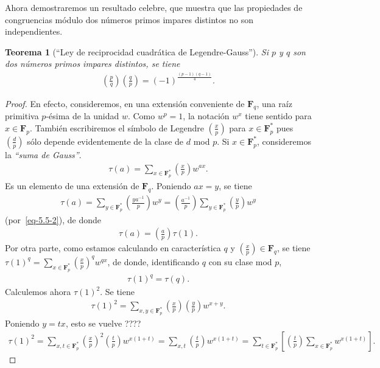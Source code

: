 \documentclass[10pt,oneside,bibtotoc,smallheadings,leqno,a5paper,DIV=12]{scrbook}
\newcommand{\FF}{\mathbf{F}}
\newcommand{\leg}[2]{\left(\frac{#1}{#2}\right)}
\numberwithin{equation}{section}
\theoremstyle{defi}
\theoremstyle{enonce}
\newtheorem{theorem}{Teorema}
\theoremstyle{rem}
\numberwithin{theorem}{section}
\numberwithin{proposition}{section}
\numberwithin{definition}{section}
\numberwithin{lemma}{section}
\numberwithin{corollary}{section}
\numberwithin{example}{section}
\numberwithin{footnote}{section}%
\begin{document}
Ahora demostraremos un resultado celebre, que muestra que las propiedades de congruencias m\'odulo dos
n\'umeros primos impares distintos no son independientes.

\begin{theorem}[``Ley de reciprocidad cuadr\'atica de Legendre-Gauss'']\label{teo5.5.1}
Si $p$ y $q$ son dos n\'umeros primos impares distintos, se tiene
\begin{gather*}
\leg{p}{q}\leg{q}{p}=(-1)^{\frac{(p-1)(q-1)}{4}}.
\end{gather*}
\end{theorem}

\begin{proof}
En efecto, consideremos, en una extensi\'on conveniente de $\FF_{q}$, una ra\'iz primitiva $p$-\'esima de
la unidad $w$. Como $w^{p}=1$, la notaci\'on $w^{x}$ tiene sentido para $x\in\FF_{p}$. Tambi\'en escribiremos
el s\'imbolo de Legendre $\leg{x}{p}$ para $x\in\FF_{p}^{*}$ pues $\leg{d}{p}$ s\'olo depende evidentemente
de la clase de $d$ mod $p$. Si $x\in\FF_{p}^{*}$, consideremos la {\em ``suma de Gauss''}.
\begin{gather}
\tau(a) = \sum_{x\in\FF_{p}^{*}}\leg{x}{p}w^{ax}.
\end{gather}
Es un elemento de una extensi\'on de $\FF_{q}$. Poniendo $ax = y$, se tiene
\begin{gather*}
\tau(a) = \sum_{y\in\FF_{p}^{*}}\leg{ya^{-1}}{p}w^{y} = \leg{a^{-1}}{p}\sum_{y\in\FF_{p}^{*}}\leg{y}{p}w^{y}
\end{gather*}
(por~\eqref{eq-5.5-2}), de donde
\begin{gather}\label{eq-5.5-4}
\tau(a) = \leg{a}{p}\tau(1).
\end{gather}
Por otra parte, como estamos calculando en caracter\'istica $q$ y $\leg{x}{p}\in\FF_{q}$, se tiene
$\tau(1)^{q}=\sum_{x\in\FF_{p}^{*}}\leg{x}{p}^{q}w^{qx}$, de donde, identificando $q$ con su clase mod $p$,
\begin{gather}\label{eq-5.5-5}
\tau(1)^{q}=\tau(q).
\end{gather}
Calculemos ahora $\tau(1)^{2}$. Se tiene
\begin{gather*}
\tau(1)^{2} = \sum_{x,y\in\FF_{p}^{*}}\leg{x}{p}\leg{y}{p}w^{x+y}.
\end{gather*}
Poniendo $y=tx$, esto se vuelve ????
\begin{gather*}
\tau(1)^{2}=\sum_{x,t\in\FF_{p}^{*}}\leg{x}{p}^{2}\leg{t}{p}w^{x(1+t)}=\sum_{x,t}\leg{t}{p}w^{x(1+t)}
=\sum_{t\in\FF_{p}^{*}}\left[\leg{t}{p}\sum_{x\in\FF_{p}^{*}}w^{x(1+t)}\right].

\end{gather*}
\end{proof}
\end{document}
